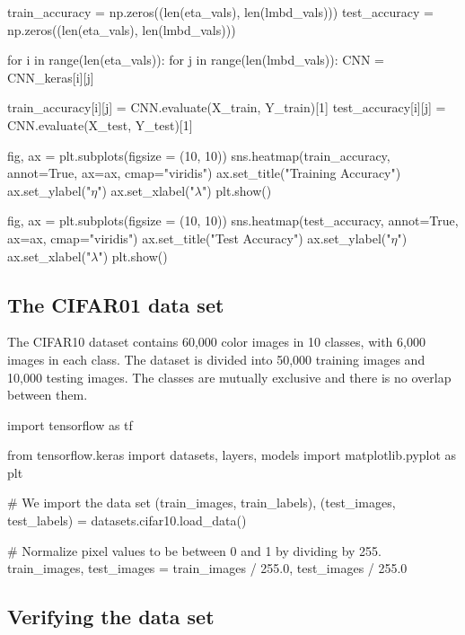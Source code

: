 \documentclass[%
oneside,                 %
final,                   %
10pt]{article}
\begin{document}
train_accuracy = np.zeros((len(eta_vals), len(lmbd_vals)))
test_accuracy = np.zeros((len(eta_vals), len(lmbd_vals)))

for i in range(len(eta_vals)):
    for j in range(len(lmbd_vals)):
        CNN = CNN_keras[i][j]

        train_accuracy[i][j] = CNN.evaluate(X_train, Y_train)[1]
        test_accuracy[i][j] = CNN.evaluate(X_test, Y_test)[1]

        
fig, ax = plt.subplots(figsize = (10, 10))
sns.heatmap(train_accuracy, annot=True, ax=ax, cmap="viridis")
ax.set_title("Training Accuracy")
ax.set_ylabel("$\eta$")
ax.set_xlabel("$\lambda$")
plt.show()

fig, ax = plt.subplots(figsize = (10, 10))
sns.heatmap(test_accuracy, annot=True, ax=ax, cmap="viridis")
ax.set_title("Test Accuracy")
ax.set_ylabel("$\eta$")
ax.set_xlabel("$\lambda$")
plt.show()

\epycod


\subsection{The CIFAR01 data set}

The CIFAR10 dataset contains 60,000 color images in 10 classes, with
6,000 images in each class. The dataset is divided into 50,000
training images and 10,000 testing images. The classes are mutually
exclusive and there is no overlap between them.













\bpycod
import tensorflow as tf

from tensorflow.keras import datasets, layers, models
import matplotlib.pyplot as plt

# We import the data set
(train_images, train_labels), (test_images, test_labels) = datasets.cifar10.load_data()

# Normalize pixel values to be between 0 and 1 by dividing by 255. 
train_images, test_images = train_images / 255.0, test_images / 255.0


\epycod


\subsection{Verifying the data set}
\end{document}
